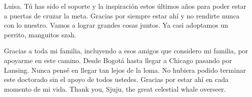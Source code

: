 \documentclass[]{msu-thesis}
\begin{document}
Luisa. Tú has sido el soporte y la inspiración estos últimos años para poder estar a puertas de cruzar la meta. Gracias por siempre estar ahí y no rendirte nunca con lo nuestro. Vamos a lograr grandes cosas juntos. Ya casi adoptamos un perrito, manguitos szah.

Gracias a toda mi familia, incluyendo a esos amigos que considero mi familia, por apoyarme en este camino. Desde Bogotá hasta llegar a Chicago pasando por Lansing. Nunca pensé en llegar tan lejos de la loma. No hubiera podido terminar este doctorado sin el apoyo de todos ustedes. Gracias por estar ahí en cada momento de mi vida. Thank you, Sjuju, the great celestial whale overseer.

%
\clearpage
\SingleSpacing
\tableofcontents* %
%
\clearpage
\listofabbreviations 

%
%
\mainmatter
%
\end{document}
